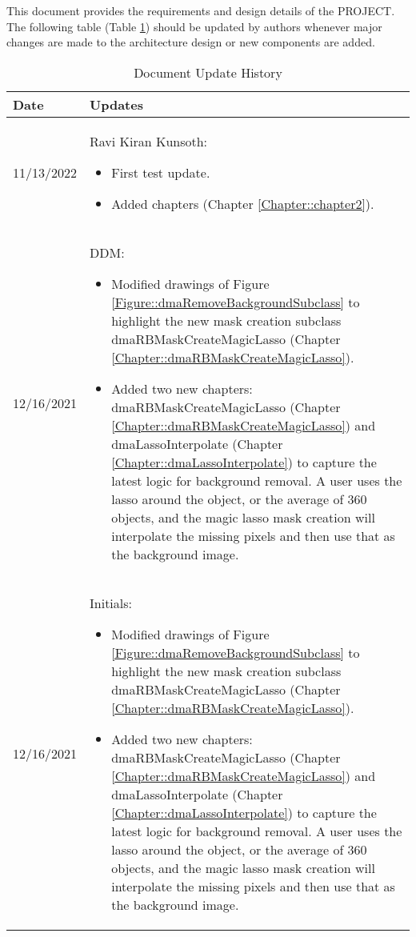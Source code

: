 This document provides the requirements and design details of the
PROJECT.  The following table (Table \ref{Table::UpdateHistory}) should be
updated by authors whenever major changes are made to the architecture
design or new components are added.  

\begin{longtable}{|l||p{13.5cm}|}
\caption{Document Update History \label{Table::UpdateHistory}}\\
\hline
\textbf{Date} & \textbf{Updates} \\
\hline 
\endhead

11/13/2022 & Ravi Kiran Kunsoth:
\begin{itemize}[topsep=0pt,itemsep=0pt,parsep=0pt,partopsep=0pt,leftmargin=12pt]
\item First test update.
\item Added chapters 
(Chapter \ref{Chapter::chapter2}). 
\end{itemize} 
\\ \hline

12/16/2021 & DDM:
\begin{itemize}[topsep=0pt,itemsep=0pt,parsep=0pt,partopsep=0pt,leftmargin=12pt]
\item Modified drawings of Figure \ref{Figure::dmaRemoveBackgroundSubclass} to
highlight the new mask creation subclass dmaRBMaskCreateMagicLasso (Chapter 
\ref{Chapter::dmaRBMaskCreateMagicLasso}).
\item Added two new chapters: dmaRBMaskCreateMagicLasso
(Chapter \ref{Chapter::dmaRBMaskCreateMagicLasso}) and dmaLassoInterpolate
(Chapter \ref{Chapter::dmaLassoInterpolate}) to capture the latest logic for 
background removal.  A user uses the lasso around the object, or the average 
of 360 objects, and the magic lasso mask creation will interpolate the missing
pixels and then use that as the background image. 
\end{itemize} 
\\ \hline

12/16/2021 & Initials:
\begin{itemize}[topsep=0pt,itemsep=0pt,parsep=0pt,partopsep=0pt,leftmargin=12pt]
\item Modified drawings of Figure \ref{Figure::dmaRemoveBackgroundSubclass} to
highlight the new mask creation subclass dmaRBMaskCreateMagicLasso (Chapter 
\ref{Chapter::dmaRBMaskCreateMagicLasso}).
\item Added two new chapters: dmaRBMaskCreateMagicLasso
(Chapter \ref{Chapter::dmaRBMaskCreateMagicLasso}) and dmaLassoInterpolate
(Chapter \ref{Chapter::dmaLassoInterpolate}) to capture the latest logic for 
background removal.  A user uses the lasso around the object, or the average 
of 360 objects, and the magic lasso mask creation will interpolate the missing
pixels and then use that as the background image. 
\end{itemize} 
\\ \hline


\end{longtable}
